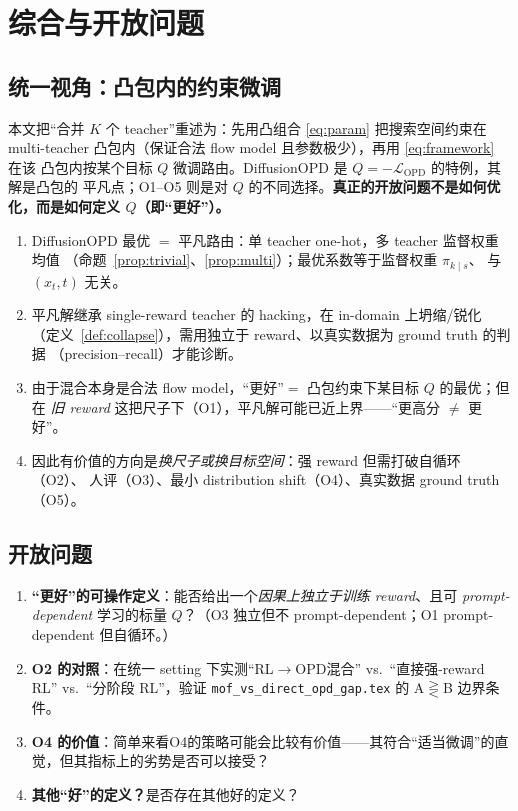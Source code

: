 \documentclass[11pt,a4paper]{article}
\newcommand{\loss}{\mathcal{L}}
\newcommand{\OPD}{\mathrm{OPD}}
\theoremstyle{definition}
\begin{document}
\section{综合与开放问题}
\label{sec:synthesis}

\subsection{统一视角：凸包内的约束微调}

本文把``合并 $K$ 个 teacher''重述为：先用凸组合 \eqref{eq:param} 把搜索空间约束在
multi-teacher 凸包内（保证合法 flow model 且参数极少），再用 \eqref{eq:framework} 在该
凸包内按某个目标 $Q$ 微调路由。DiffusionOPD 是 $Q=-\loss_{\OPD}$ 的特例，其解是凸包的
平凡点；O1--O5 则是对 $Q$ 的不同选择。\textbf{真正的开放问题不是如何优化，而是如何定义
$Q$（即``更好''）。}

\begin{tcolorbox}[colback=yellow!5,colframe=yellow!60!black,title=\textbf{核心论断}]
\begin{enumerate}[leftmargin=1.5em]
\item DiffusionOPD 最优 $=$ 平凡路由：单 teacher one-hot，多 teacher 监督权重均值
（命题~\ref{prop:trivial}、\ref{prop:multi}）；最优系数等于监督权重 $\pi_{k\mid s}$、
与 $(x_t,t)$ 无关。
\item 平凡解继承 single-reward teacher 的 hacking，在 in-domain 上坍缩/锐化
（定义~\ref{def:collapse}），需用独立于 reward、以真实数据为 ground truth 的判据
（precision--recall）才能诊断。
\item 由于混合本身是合法 flow model，``更好''$=$ 凸包约束下某目标 $Q$ 的最优；但在
\emph{旧 reward} 这把尺子下（O1），平凡解可能已近上界——``更高分 $\neq$ 更好''。
\item 因此有价值的方向是\emph{换尺子或换目标空间}：强 reward 但需打破自循环（O2）、
人评（O3）、最小 distribution shift（O4）、真实数据 ground truth（O5）。
\end{enumerate}
\end{tcolorbox}

\subsection{开放问题}
\begin{enumerate}[leftmargin=1.5em]
\item \textbf{``更好''的可操作定义}：能否给出一个\emph{因果上独立于训练 reward}、且可
\emph{prompt-dependent} 学习的标量 $Q$？（O3 独立但不 prompt-dependent；O1 prompt-dependent
但自循环。）
\item \textbf{O2 的对照}：在统一 setting 下实测``RL$\to$OPD混合'' vs.\ ``直接强-reward RL''
vs.\ ``分阶段 RL''，验证 \texttt{mof\_vs\_direct\_opd\_gap.tex} 的 A$\gtreqless$B 边界条件。
\item \textbf{O4 的价值}：简单来看O4的策略可能会比较有价值——其符合``适当微调''的直觉，但其指标上的劣势是否可以接受？
\item \textbf{其他“好”的定义？}是否存在其他好的定义？
\end{enumerate}
\end{document}
